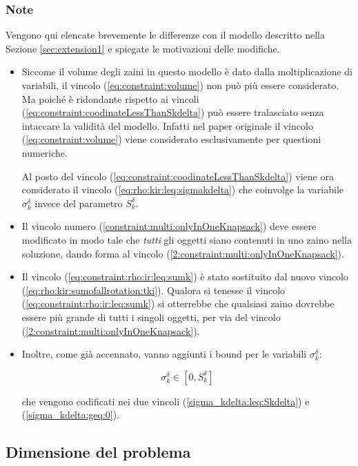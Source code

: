 \subsubsection{Note}
\label{sec:extension2:Note}
Vengono qui elencate brevemente le differenze con il modello descritto nella 
Sezione \ref{sec:extension1} e spiegate le motivazioni delle modifiche.
\begin{itemize}

\item Siccome il volume degli zaini in questo modello è dato dalla 
moltiplicazione di variabili, il vincolo
(\ref{eq:constraint:volume}) non può più essere considerato. 
Ma poiché è ridondante rispetto ai vincoli 
(\ref{eq:constraint:coodinateLessThanSkdelta})
può essere tralasciato senza intaccare la validità del modello.
Infatti nel paper originale il vincolo (\ref{eq:constraint:volume}) viene 
considerato esclusivamente per questioni numeriche.

Al posto del vincolo (\ref{eq:constraint:coodinateLessThanSkdelta}) viene ora 
considerato il vincolo 
(\ref{eq:rho:kir:leq:sigmakdelta}) che coinvolge la variabile $\sigma_k^\delta$
invece del parametro $S_k^\delta$.

\item Il vincolo numero (\ref{constraint:multi:onlyInOneKnapsack}) deve essere 
modificato in modo tale che \emph{tutti} gli oggetti siano contenuti in uno 
zaino nella soluzione, dando forma al vincolo 
(\ref{2:constraint:multi:onlyInOneKnapsack}).

\item Il vincolo (\ref{eq:constraint:rho:ir:leq:sumk}) è stato sostituito dal
nuovo vincolo (\ref{eq:rho:kir:sumofallrotation:tki}). Qualora si tenesse il
vincolo (\ref{eq:constraint:rho:ir:leq:sumk}) si otterrebbe che qualsiasi zaino
 dovrebbe essere più grande di tutti i singoli oggetti, per via  del vincolo
 (\ref{2:constraint:multi:onlyInOneKnapsack}).

\item Inoltre, come già accennato, vanno aggiunti i bound per le variabili 
$\sigma_k^\delta$:

\begin{equation}
\sigma_k^\delta \in [ 0, S_k^\delta ]
\end{equation}

che vengono codificati nei due vincoli
(\ref{sigma_kdelta:leq:Skdelta}) e (\ref{sigma_kdelta:geq:0}).
\end{itemize}
\subsection{Dimensione del problema}

